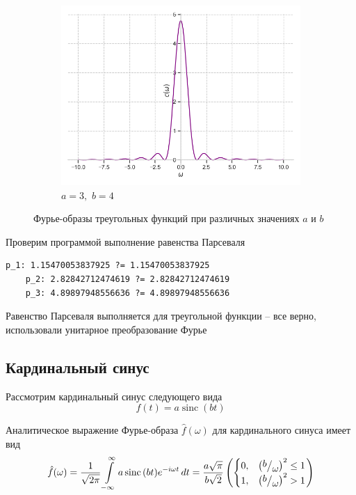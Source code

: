\documentclass[a4paper, 16pt]{article}
\DeclareMathOperator{\sinc}{sinc}
\newcommand{\frc}[2]{\raisebox{2pt}{$#1$}\big/\raisebox{-3pt}{$#2$}}
\begin{document}
\begin{figure}[htbp]
\begin{subfigure}{0.3\textwidth}
            \centering
            \includegraphics[width=\linewidth]{trifimg_a=3_b=4.png}
            \caption{$a=3,\,\,b=4$}
            \label{fig:trifimg_3}
        \end{subfigure}
        \caption{Фурье-образы треугольных функций при различных значениях $a$ и $b$}
        \label{fig:trifimgs}
    \end{figure}


    \newpage
    \noindent Проверим программой выполнение равенства Парсеваля
    \begin{lstlisting}[label=parstrif, caption=Равенство Парсеваля для треугольных функций]
    p_1: 1.15470053837925 ?= 1.15470053837925
    p_2: 2.82842712474619 ?= 2.82842712474619
    p_3: 4.89897948556636 ?= 4.89897948556636
    \end{lstlisting}


    \noindent Равенство Парсеваля выполняется для треугольной функции -- все верно, использовали унитарное преобразование Фурье


    \subsection{Кардинальный синус}
    \noindent Рассмотрим кардинальный синус следующего вида
    $$
    f(t)=a\sinc{(bt)}
    $$


    \noindent Аналитическое выражение Фурье-образа $\hat{f}(\omega)$ для кардинального синуса
    имеет вид
    $$
    \hat{f}(\omega)=\dfrac{1}{\sqrt{2\pi}}\int\limits_{-\infty}^{\infty}a\sinc{(bt)}e^{-i\omega t}\,dt=\dfrac{a\sqrt{\pi}}{b\sqrt{2}}
    \left(
        \begin{cases}
            0, & \left(\frc{b}{\omega}\right)^{2}\leq 1\\
            1, & \left(\frc{b}{\omega}\right)^{2}>1
        \end{cases}
    \right)
    $$
\end{document}
